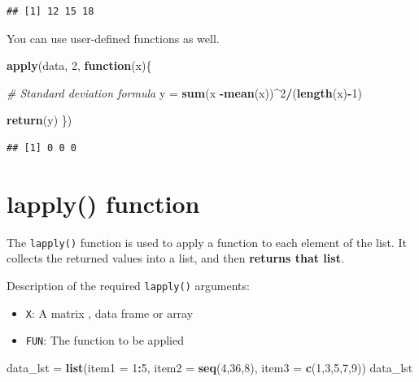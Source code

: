 \documentclass[
]{book}
\newenvironment{Shaded}{\begin{snugshade}}{\end{snugshade}}
\newcommand{\CommentTok}[1]{\textcolor[rgb]{0.56,0.35,0.01}{\textit{#1}}}
\newcommand{\ControlFlowTok}[1]{\textcolor[rgb]{0.13,0.29,0.53}{\textbf{#1}}}
\newcommand{\DataTypeTok}[1]{\textcolor[rgb]{0.13,0.29,0.53}{#1}}
\newcommand{\DecValTok}[1]{\textcolor[rgb]{0.00,0.00,0.81}{#1}}
\newcommand{\KeywordTok}[1]{\textcolor[rgb]{0.13,0.29,0.53}{\textbf{#1}}}
\newcommand{\NormalTok}[1]{#1}
\newcommand{\OperatorTok}[1]{\textcolor[rgb]{0.81,0.36,0.00}{\textbf{#1}}}
\newcommand{\StringTok}[1]{\textcolor[rgb]{0.31,0.60,0.02}{#1}}
\providecommand{\tightlist}{%
  \setlength{\itemsep}{0pt}\setlength{\parskip}{0pt}}
\begin{document}
\begin{verbatim}
## [1] 12 15 18
\end{verbatim}

You can use user-defined functions as well.

\begin{Shaded}
\begin{Highlighting}[]
\KeywordTok{apply}\NormalTok{(data, }\DecValTok{2}\NormalTok{, }\ControlFlowTok{function}\NormalTok{(x)\{}
  
  \CommentTok{# Standard deviation formula }
\NormalTok{  y =}\StringTok{ }\KeywordTok{sum}\NormalTok{(x }\OperatorTok{-}\KeywordTok{mean}\NormalTok{(x))}\OperatorTok{^}\DecValTok{2}\OperatorTok{/}\NormalTok{(}\KeywordTok{length}\NormalTok{(x)}\OperatorTok{-}\DecValTok{1}\NormalTok{)}
  
  \KeywordTok{return}\NormalTok{(y)}
\NormalTok{  \})}
\end{Highlighting}
\end{Shaded}

\begin{verbatim}
## [1] 0 0 0
\end{verbatim}

\hypertarget{lapply-function}{%
\section{lapply() function}\label{lapply-function}}

The \texttt{lapply()} function is used to apply a function to each element of the list. It collects the returned values into a list, and then \textbf{returns that list}.

Description of the required \texttt{lapply()} arguments:

\begin{itemize}
\tightlist
\item
  \texttt{X}: A matrix , data frame or array
\item
  \texttt{FUN}: The function to be applied
\end{itemize}

\begin{Shaded}
\begin{Highlighting}[]
\NormalTok{data_lst =}\StringTok{ }\KeywordTok{list}\NormalTok{(}\DataTypeTok{item1 =} \DecValTok{1}\OperatorTok{:}\DecValTok{5}\NormalTok{,}
             \DataTypeTok{item2 =} \KeywordTok{seq}\NormalTok{(}\DecValTok{4}\NormalTok{,}\DecValTok{36}\NormalTok{,}\DecValTok{8}\NormalTok{),}
             \DataTypeTok{item3 =} \KeywordTok{c}\NormalTok{(}\DecValTok{1}\NormalTok{,}\DecValTok{3}\NormalTok{,}\DecValTok{5}\NormalTok{,}\DecValTok{7}\NormalTok{,}\DecValTok{9}\NormalTok{))}
\NormalTok{data_lst }
\end{Highlighting}
\end{Shaded}
\end{document}

